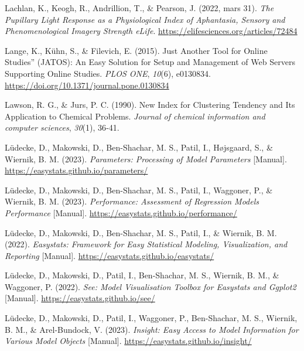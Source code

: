 \documentclass[
  12pt,
]{article}
\newlength{\cslhangindent}
\newlength{\cslentryspacingunit} %
\newenvironment{CSLReferences}[2] %
 {%
  \setlength{\parindent}{0pt}
  \ifodd #1
  \let\oldpar\par
  \def\par{\hangindent=\cslhangindent\oldpar}
  \fi
  \setlength{\parskip}{#2\cslentryspacingunit}
 }%
 {}
\begin{document}
\begin{CSLReferences}{1}{0}
\leavevmode{}%
Lachlan, K., Keogh, R., Andrillion, T., \& Pearson, J. (2022, mars 31).
\emph{The Pupillary Light Response as a Physiological Index of
Aphantasia, Sensory and Phenomenological Imagery Strength \textbar{}
{eLife}}. \url{https://elifesciences.org/articles/72484}

\leavevmode{}%
Lange, K., Kühn, S., \& Filevich, E. (2015). {Just Another Tool} for
{Online Studies}'' ({JATOS}): {An Easy Solution} for {Setup} and
{Management} of {Web Servers Supporting Online Studies}. \emph{PLOS
ONE}, \emph{10}(6), e0130834.
\url{https://doi.org/10.1371/journal.pone.0130834}

\leavevmode{}%
Lawson, R. G., \& Jurs, P. C. (1990). New Index for Clustering Tendency
and Its Application to Chemical Problems. \emph{Journal of chemical
information and computer sciences}, \emph{30}(1), 36‑41.

\leavevmode{}%
Lüdecke, D., Makowski, D., Ben-Shachar, M. S., Patil, I., Højsgaard, S.,
\& Wiernik, B. M. (2023). \emph{Parameters: {Processing} of Model
Parameters} {[}Manual{]}. \url{https://easystats.github.io/parameters/}

\leavevmode{}%
Lüdecke, D., Makowski, D., Ben-Shachar, M. S., Patil, I., Waggoner, P.,
\& Wiernik, B. M. (2023). \emph{Performance: {Assessment} of Regression
Models Performance} {[}Manual{]}.
\url{https://easystats.github.io/performance/}

\leavevmode{}%
Lüdecke, D., Makowski, D., Ben-Shachar, M. S., Patil, I., \& Wiernik, B.
M. (2022). \emph{Easystats: {Framework} for Easy Statistical Modeling,
Visualization, and Reporting} {[}Manual{]}.
\url{https://easystats.github.io/easystats/}

\leavevmode{}%
Lüdecke, D., Makowski, D., Patil, I., Ben-Shachar, M. S., Wiernik, B.
M., \& Waggoner, P. (2022). \emph{See: {Model Visualisation Toolbox} for
Easystats and Ggplot2} {[}Manual{]}.
\url{https://easystats.github.io/see/}

\leavevmode{}%
Lüdecke, D., Makowski, D., Patil, I., Waggoner, P., Ben-Shachar, M. S.,
Wiernik, B. M., \& Arel-Bundock, V. (2023). \emph{Insight: {Easy} Access
to Model Information for Various Model Objects} {[}Manual{]}.
\url{https://easystats.github.io/insight/}


\end{CSLReferences}
\end{document}
